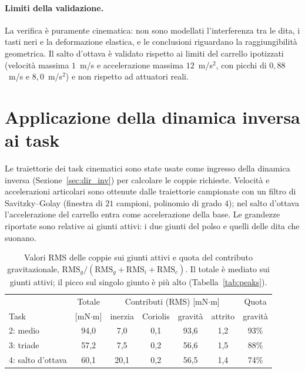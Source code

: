 \paragraph{Limiti della validazione.} La verifica è puramente cinematica: non sono modellati l'interferenza tra le dita, i tasti neri e la deformazione elastica, e le conclusioni riguardano la raggiungibilità geometrica. Il salto d'ottava è validato rispetto ai limiti del carrello ipotizzati (velocità massima $1$~m/s e accelerazione massima $12$~m/s$^2$, con picchi di $0{,}88$~m/s e $8{,}0$~m/s$^2$) e non rispetto ad attuatori reali.

\section{Applicazione della dinamica inversa ai task}
\label{sec:val_dinamica}

Le traiettorie dei task cinematici sono state usate come ingresso della dinamica inversa (Sezione~\ref{sec:dir_inv}) per calcolare le coppie richieste. Velocità e accelerazioni articolari sono ottenute dalle traiettorie campionate con un filtro di Savitzky--Golay (finestra di $21$ campioni, polinomio di grado $4$); nel salto d'ottava l'accelerazione del carrello entra come accelerazione della base. Le grandezze riportate sono relative ai giunti attivi: i due giunti del polso e quelli delle dita che suonano.

\begin{table}[htbp]
    \centering
    \renewcommand{\arraystretch}{1.1}
    \begin{tabular}{|l|c|cccc|c|}
        \hline
        & Totale & \multicolumn{4}{c|}{Contributi (RMS) [mN$\cdot$m]} & Quota\\
        Task & [mN$\cdot$m] & inerzia & Coriolis & gravità & attrito & gravità\\ \hline \hline
        2: medio & 94,0 & 7,0 & 0,1 & 93,6 & 1,2 & 93\%\\
        3: triade & 57,2 & 7,5 & 0,2 & 56,6 & 1,5 & 88\%\\
        4: salto d'ottava & 60,1 & 20,1 & 0,2 & 56,5 & 1,4 & 74\%\\ \hline
    \end{tabular}
    \caption{Valori RMS delle coppie sui giunti attivi e quota del contributo gravitazionale, $\mathrm{RMS}_g/(\mathrm{RMS}_g+\mathrm{RMS}_i+\mathrm{RMS}_c)$. Il totale è mediato sui giunti attivi; il picco sul singolo giunto è più alto (Tabella~\ref{tab:peaks}).}
    \label{tab:id}
\end{table}


